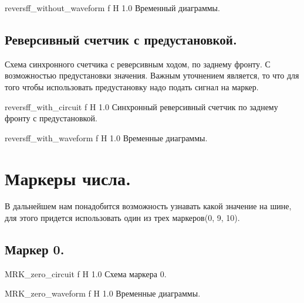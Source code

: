 \documentclass{bmstu}
\begin{document}
	{reversff_without_waveform}
	{f} %
	{H} %
	{1.0\textwidth} %
	{Временный диаграммы.} %

	\subsection{Реверсивный счетчик с предустановкой.}

	\begin{flushleft}
		Схема синхронного счетчика с реверсивным ходом, по заднему фронту. 
		С возможностью предустановки значения. Важным уточнением является, 
		то что для того чтобы использовать предустановку надо подать сигнал на маркер.
	\end{flushleft}
	
	{reversff_with_circuit}
	{f} %
	{H} %
	{1.0\textwidth} %
	{Синхронный реверсивный счетчик по заднему фронту с предустановкой.} %
	
	{reversff_with_waveform}
	{f} %
	{H} %
	{1.0\textwidth} %
	{Временные диаграммы.} %

	\section{Маркеры числа.}

	\begin{flushleft}
		В дальнейшем нам понадобится возможность узнавать какой значение на шине, 
		для этого придется использовать один из трех маркеров(0, 9, 10). 
	\end{flushleft}

	\subsection{Маркер 0.}
	
	{MRK_zero_circuit}
	{f} %
	{H} %
	{1.0\textwidth} %
	{Схема маркера 0.} %
	
	{MRK_zero_waveform}
	{f} %
	{H} %
	{1.0\textwidth} %
	{Временные диаграммы.} %
	
\end{document}
